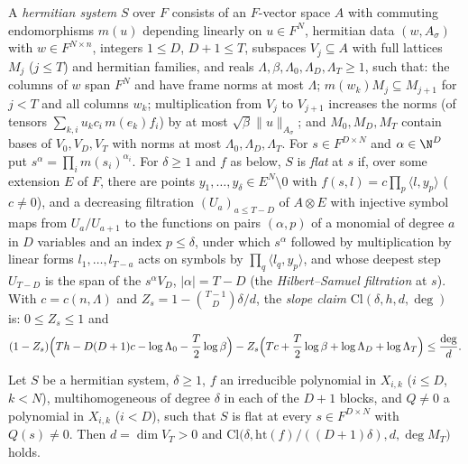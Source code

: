 \begin{definition}\label{pf:lift1:hsys}
A \emph{hermitian system} $S$ over $F$ consists of an $F$-vector space $A$ with commuting endomorphisms
$m(u)$ depending linearly on $u\in F^N$, hermitian data $(w,A_\sigma)$ with $w\in F^{N\times n}$, integers
$1\le D$, $D+1\le T$, subspaces $V_j\subseteq A$ with full lattices $M_j$ ($j\le T$) and hermitian
families, and reals $\Lambda,\beta,\Lambda_0,\Lambda_D,\Lambda_T\ge1$, such that: the columns of $w$ span
$F^N$ and have frame norms at most $\Lambda$; $m(w_k)M_j\subseteq M_{j+1}$ for $j<T$ and all columns
$w_k$; multiplication from $V_j$ to $V_{j+1}$ increases the norms (of tensors $\sum_{k,i}u_kc_i\,m(e_k)f_i$)
by at most $\sqrt\beta\|u\|_{A_\sigma}$; and $M_0,M_D,M_T$ contain bases of $V_0,V_D,V_T$ with norms at most
$\Lambda_0,\Lambda_D,\Lambda_T$. For $s\in F^{D\times N}$ and $\alpha\in\N^D$ put
$s^\alpha=\prod_im(s_i)^{\alpha_i}$. For $\delta\ge1$ and $f$ as below, $S$ is \emph{flat} at $s$ if, over
some extension $E$ of $F$, there are points $y_1,\dots,y_\delta\in E^N\setminus0$ with
$f(s,l)=c\prod_p\langle l,y_p\rangle$ ($c\ne0$), and a decreasing filtration $(U_a)_{a\le T-D}$ of
$A\otimes E$ with injective symbol maps from $U_a/U_{a+1}$ to the functions on pairs $(\alpha,p)$ of a
monomial of degree $a$ in $D$ variables and an index $p\le\delta$, under which $s^\alpha$ followed by
multiplication by linear forms $l_1,\dots,l_{T-a}$ acts on symbols by $\prod_q\langle l_q,y_p\rangle$, and
whose deepest step $U_{T-D}$ is the span of the $s^\alpha V_D$, $|\alpha|=T-D$ (the
\emph{Hilbert--Samuel filtration} at $s$). With $c=c(n,\Lambda)$ and $Z_s=1-\binom{T-1}D\delta/d$, the
\emph{slope claim} $\mathrm{Cl}(\delta,h,d,\deg)$ is: $0\le Z_s\le1$ and
\[
(1-Z_s)\Bigl(Th-D(D+1)c-\log\Lambda_0-\frac T2\log\beta\Bigr)
-Z_s\Bigl(Tc+\frac T2\log\beta+\log\Lambda_D+\log\Lambda_T\Bigr)\le\frac{\deg}d .
\]
\end{definition}

\begin{theorem}\label{pf:lift1:slope}
Let $S$ be a hermitian system, $\delta\ge1$, $f$ an irreducible polynomial in $X_{i,k}$ ($i\le D$, $k<N$),
multihomogeneous of degree $\delta$ in each of the $D+1$ blocks, and $Q\ne0$ a polynomial in $X_{i,k}$
($i<D$), such that $S$ is flat at every $s\in F^{D\times N}$ with $Q(s)\ne0$. Then $d=\dim V_T>0$ and
$\mathrm{Cl}\bigl(\delta,\mathrm{ht}(f)/((D+1)\delta),d,\deg M_T\bigr)$ holds.
\end{theorem}

